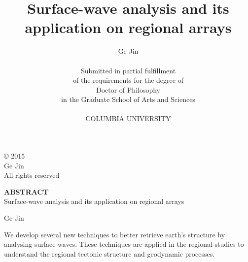 \begin{titlepage}
\singlespacing
\title{Surface-wave analysis and its application on regional arrays}
\author{Ge Jin\\
\vspace{272pt}\\
Submitted in partial fulfillment \\
of the requirements
for the degree of \\
Doctor of Philosophy \\
in the Graduate School of Arts and Sciences \\
\vspace{24pt}\\
COLUMBIA UNIVERSITY \\}
\maketitle
\end{titlepage}

\vspace{10cm}
\singlespacing
\null
\begin{center}
\begin{bottompar}
{\large \copyright  \hspace{1mm} 2015 \\
Ge Jin\\
All rights reserved}
\end{bottompar}

\doublespacing
\large
{\bf ABSTRACT}\\
Surface-wave analysis and its application on regional arrays

Ge Jin
\end{center}
\doublespacing

We develop several new techniques to better retrieve earth's structure by analysing surface waves. These techniques are applied in the regional studies to understand the regional tectonic structure and geodynamic processes.

